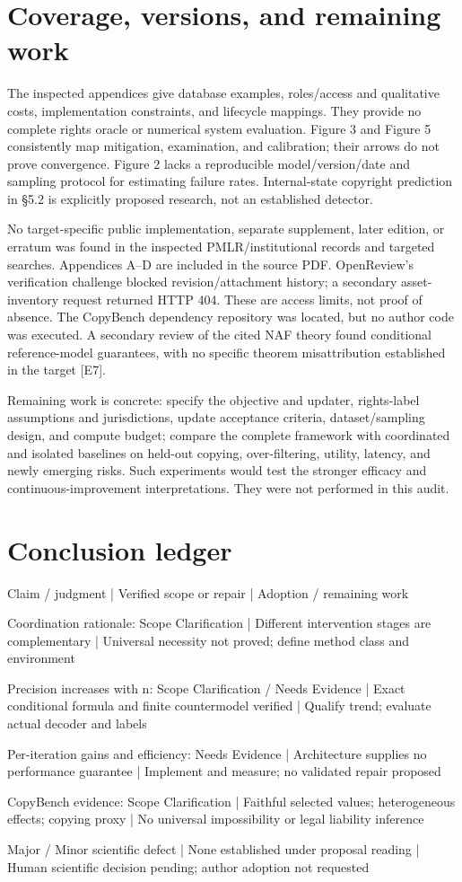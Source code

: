 \documentclass[10pt]{article}
\begin{document}
\section*{Coverage, versions, and remaining work}
The inspected appendices give database examples, roles/access and qualitative costs, implementation constraints, and lifecycle mappings. They provide no complete rights oracle or numerical system evaluation. Figure 3 and Figure 5 consistently map mitigation, examination, and calibration; their arrows do not prove convergence. Figure 2 lacks a reproducible model/version/date and sampling protocol for estimating failure rates. Internal-state copyright prediction in §5.2 is explicitly proposed research, not an established detector.\par
No target-specific public implementation, separate supplement, later edition, or erratum was found in the inspected PMLR/institutional records and targeted searches. Appendices A–D are included in the source PDF. OpenReview’s verification challenge blocked revision/attachment history; a secondary asset-inventory request returned HTTP 404. These are access limits, not proof of absence. The CopyBench dependency repository was located, but no author code was executed. A secondary review of the cited NAF theory found conditional reference-model guarantees, with no specific theorem misattribution established in the target [E7].\par
Remaining work is concrete: specify the objective and updater, rights-label assumptions and jurisdictions, update acceptance criteria, dataset/sampling design, and compute budget; compare the complete framework with coordinated and isolated baselines on held-out copying, over-filtering, utility, latency, and newly emerging risks. Such experiments would test the stronger efficacy and continuous-improvement interpretations. They were not performed in this audit.\par
\section*{Conclusion ledger}
Claim / judgment | Verified scope or repair | Adoption / remaining work\par
Coordination rationale: Scope Clarification | Different intervention stages are complementary | Universal necessity not proved; define method class and environment\par
Precision increases with n: Scope Clarification / Needs Evidence | Exact conditional formula and finite countermodel verified | Qualify trend; evaluate actual decoder and labels\par
Per-iteration gains and efficiency: Needs Evidence | Architecture supplies no performance guarantee | Implement and measure; no validated repair proposed\par
CopyBench evidence: Scope Clarification | Faithful selected values; heterogeneous effects; copying proxy | No universal impossibility or legal liability inference\par
Major / Minor scientific defect | None established under proposal reading | Human scientific decision pending; author adoption not requested\par
\end{document}

